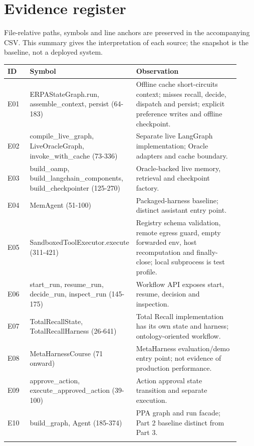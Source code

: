 \documentclass[10pt,letterpaper]{article}
\begin{document}
\section{Evidence register}
File-relative paths, symbols and line anchors are preserved in the accompanying CSV. This summary gives the interpretation of each source; the snapshot is the baseline, not a deployed system.
\begin{longtable}{@{}>{\raggedright\arraybackslash}p{0.1\linewidth}>{\raggedright\arraybackslash}p{0.32\linewidth}>{\raggedright\arraybackslash}p{0.5\linewidth}@{}}
\toprule
ID & Symbol & Observation\\\midrule\endhead
E01 & ERPAStateGraph.run, assemble\_context, persist (64-183) & Offline cache short-circuits context; misses recall, decide, dispatch and persist; explicit preference writes and offline checkpoint.\\\addlinespace
E02 & compile\_live\_graph, LiveOracleGraph, invoke\_with\_cache (73-336) & Separate live LangGraph implementation; Oracle adapters and cache boundary.\\\addlinespace
E03 & build\_oamp, build\_langchain\_components, build\_checkpointer (125-270) & Oracle-backed live memory, retrieval and checkpoint factory.\\\addlinespace
E04 & MemAgent (51-100) & Packaged-harness baseline; distinct assistant entry point.\\\addlinespace
E05 & SandboxedToolExecutor.execute (311-421) & Registry schema validation, remote egress guard, empty forwarded env, host recomputation and finally-close; local subprocess is test profile.\\\addlinespace
E06 & start\_run, resume\_run, decide\_run, inspect\_run (145-175) & Workflow API exposes start, resume, decision and inspection.\\\addlinespace
E07 & TotalRecallState, TotalRecallHarness (26-641) & Total Recall implementation has its own state and harness; ontology-oriented workflow.\\\addlinespace
E08 & MetaHarnessCourse (71 onward) & MetaHarness evaluation/demo entry point; not evidence of production performance.\\\addlinespace
E09 & approve\_action, execute\_approved\_action (39-100) & Action approval state transition and separate execution.\\\addlinespace
E10 & build\_graph, Agent (185-374) & PPA graph and run facade; Part 2 baseline distinct from Part 3.\\\addlinespace

\end{longtable}
\end{document}
